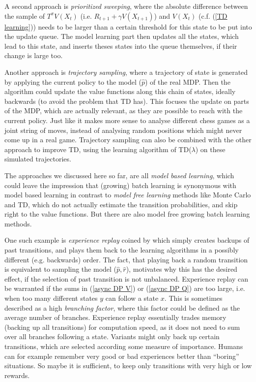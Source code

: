 A second approach is \emph{prioritized sweeping}, where the absolute difference between the sample of \(T^\pi V(X_t)\) (i.e. \(R_{t+1}+\gamma V(X_{t+1})\)) and \(V(X_t)\) (c.f. (\ref{TD learning})) needs to be larger than a certain threshold for this state to be put into the update queue. The model learning part then updates all the states, which lead to this state, and inserts theses states into the queue themselves, if their change is large too. 

Another approach is \emph{trajectory sampling}, where a trajectory of state is generated by applying the current policy to the model (\(\hat{p}\)) of the real MDP. Then the algorithm could update the value functions along this chain of states, ideally backwards (to avoid the problem that TD has). This focuses the update on parts of the MDP, which are actually relevant, as they are possible to reach with the current policy. Just like it makes more sense to analyse different chess games as a joint string of moves, instead of analysing random positions which might never come up in a real game. Trajectory sampling can also be combined with the other approach to improve TD, using the learning algorithm of TD(\(\lambda\)) on these simulated trajectories. 

The approaches we discussed here so far, are all \emph{model based learning}, which could leave the impression that (growing) batch learning is synonymous with model based learning in contrast to \emph{model free learning} methods like Monte Carlo and TD, which do not actually estimate the transition probabilities, and skip right to the value functions. But there are also model free growing batch learning methods. 

One such example is \emph{experience replay} coined by \textcite{linSelfimprovingReactiveAgents1992} which simply creates backups of past transitions, and plays them back to the learning algorithms in a possibly different (e.g. backwards) order. The fact, that playing back a random transition is equivalent to sampling the model (\(\hat{p}, \hat{r}\)), motivates why this has the desired effect, if the selection of past transition is not unbalanced. Experience replay can be warranted if the sums in (\ref{async DP V}) or (\ref{async DP Q}) are too large, i.e. when too many different states \(y\) can follow a state \(x\). This is sometimes described as a high \emph{branching factor}, where this factor could be defined as the average number of branches. Experience replay essentially trades memory (backing up all transitions) for computation speed, as it does not need to sum over all branches following a state. Variants might only back up certain transitions, which are selected according some measure of importance. Humans can for example remember very good or bad experiences better than ``boring'' situations. So maybe it is sufficient, to keep only transitions with very high or low rewards. 

